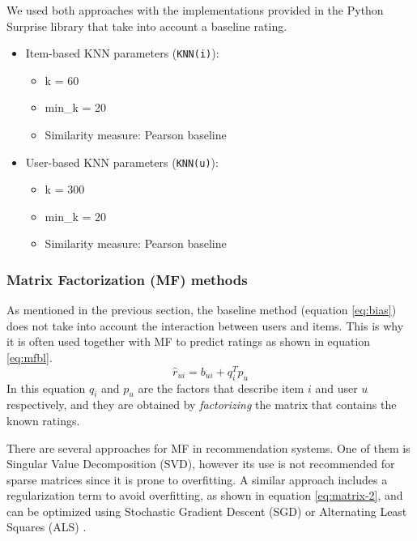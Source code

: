 \documentclass[10pt,conference,compsocconf]{IEEEtran}
\begin{document}
      We used both approaches with the implementations provided in the Python Surprise library \cite{surprise} that take into account a baseline rating.

      \begin{itemize}
        \item {Item-based KNN} parameters (\texttt{KNN(i)}):
          \begin{itemize}
            \item k = 60
            \item min\_k = 20
            \item Similarity measure: Pearson baseline
          \end{itemize}
        \item {User-based KNN} parameters (\texttt{KNN(u)}):
          \begin{itemize}
            \item k = 300
            \item min\_k = 20
            \item Similarity measure: Pearson baseline
          \end{itemize}
      \end{itemize}
    \subsubsection{Matrix Factorization (MF) methods} %
    \label{ssub:matrix_factorization_methods}
      As mentioned in the previous section, the baseline method (equation \ref{eq:bias}) does not take into account the interaction between users and items. This is why it is often used together with MF to predict ratings as shown in equation \ref{eq:mfbl}.
      \begin{equation}
        \label{eq:mfbl}
        \hat{r}_{ui} = b_{ui} + q_i^T p_u
      \end{equation}
      In this equation $q_i$ and $p_u$ are the factors that describe item $i$ and user $u$ respectively, and they are obtained by \emph{factorizing} the matrix that contains the known ratings.

      There are several approaches for MF in recommendation systems. One of them is Singular Value Decomposition (SVD), however its use is not recommended for sparse matrices since it is prone to overfitting. A similar approach includes a regularization term to avoid overfitting, as shown in equation \ref{eq:matrix-2}, and can be optimized using Stochastic Gradient Descent (SGD) or Alternating Least Squares (ALS) \cite{koren2009matrix}.
\end{document}
